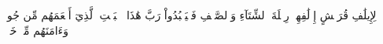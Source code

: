 لِإِيلَٰفِ قُرَيۡشٍ
إِۦلَٰفِهِمۡ رِحۡلَةَ ٱلشِّتَآءِ وَٱلصَّيۡفِ
فَلۡيَعۡبُدُواْ رَبَّ هَٰذَا ٱلۡبَيۡتِ
ٱلَّذِيٓ أَطۡعَمَهُم مِّن جُوعٖ وَءَامَنَهُم مِّنۡ خَوۡفِۭ
